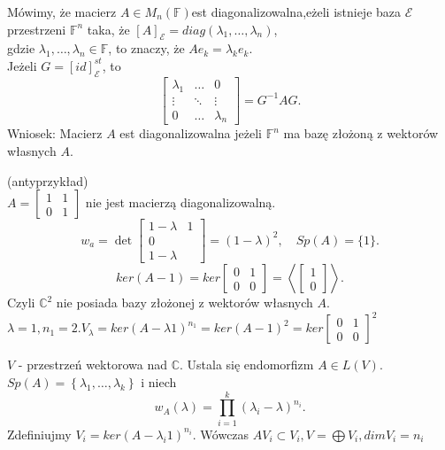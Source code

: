 \documentclass[../main.tex]{subfiles}
\begin{document}
    \begin{definicja}
        Mówimy, że macierz $A\in M_n(\mathbb{F})$est diagonalizowalna,eżeli istnieje baza $\mathcal{E}$ przestrzeni $\mathbb{F}^n$ taka, że $[A]_\mathcal{E} = diag(\lambda_1,\ldots,\lambda_n)$,\\
        gdzie $\lambda_1,\ldots,\lambda_n\in\mathbb{F}$, to znaczy, że $A e_k = \lambda_k e_k$.\\
        Jeżeli $G = [id]_\mathcal{E}^{st}$, to
        \[
            \begin{bmatrix} \lambda_1&\ldots&0\\ \vdots&\ddots&\vdots\\ 0&\dots&\lambda_n  \end{bmatrix} = G^{-1}A G
        .\]
        Wniosek: Macierz $A$ est diagonalizowalna jeżeli $\mathbb{F}^n$ ma bazę złożoną z wektorów własnych $A$.
    \end{definicja}
    \begin{przyklad}
        (antyprzykład)\\
        $A = \begin{bmatrix} 1&1\\0&1 \end{bmatrix} $ nie jest macierzą diagonalizowalną.
        \[
            w_a = \det \begin{bmatrix} 1-\lambda&1\\0\\1-\lambda \end{bmatrix} = (1-\lambda)^2,\quad Sp(A) = \{1\}
        .\]
        \[
            ker(A - 1) = ker\begin{bmatrix} 0&1\\0&0 \end{bmatrix} = \left< \begin{bmatrix} 1\\0 \end{bmatrix} \right>
        .\]
        Czyli $\mathbb{C}^2$ nie posiada bazy złożonej z wektorów własnych $A$.\\
        $\lambda = 1, n_1 = 2. V_\lambda = ker(A-\lambda 1)^{n_1} = ker(A-1)^2 = ker \begin{bmatrix} 0&1\\0&0 \end{bmatrix}^2$
    \end{przyklad}
    \begin{tw}
        $V$ - przestrzeń wektorowa nad $\mathbb{C}$. Ustala się endomorfizm $A\in L(V)$. $Sp(A) = \left\{ \lambda_1,\ldots,\lambda_k \right\} $ i niech
        \[
            w_A(\lambda) = \prod_{i=1}^{k} (\lambda_i - \lambda)^{n_i}
        .\]
        Zdefiniujmy $V_i = ker(A-\lambda_i 1)^{n_i}$. Wówczas $A V_i \subset V_i, V=\bigoplus V_i, dim V_i = n_i$
    \end{tw}
\end{document}
